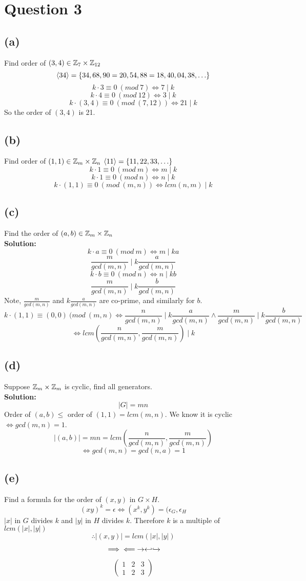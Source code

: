 \documentclass[openany]{report}
\begin{document}
\section{Question 3}
\subsection{(a)}
Find order of $(3,4) \in \mathbb{Z}_7 \times \mathbb{Z}_{12}$
$$\langle 34 \rangle = \{34,68, 90 = 20, 54, 88=18, 40, 04, 38, \ldots \}$$
$$k \cdot 3 \equiv 0 \ (mod \ 7) \iff 7 \mid k$$
$$k \cdot 4 \equiv 0 \ (mod \ 12) \iff 3 \mid k$$
$$k \cdot (3,4) \equiv 0 \ (mod \ (7,12)) \iff 21 \mid k$$
So the order of $(3,4)$ is 21.
\subsection{(b)}
Find order of $(1,1) \in \mathbb{Z}_m \times \mathbb{Z}_n$
$\langle 11 \rangle = \{11,22,33, \ldots\}$
$$k \cdot 1 \equiv 0 \ (mod \ m) \iff m \mid k$$
$$k \cdot 1 \equiv 0 \ (mod \ n) \iff n \mid k$$
$$k \cdot (1,1) \equiv 0 \ (mod \ (m,n)) \iff lcm(n,m) \mid k$$
\subsection{(c)} Find the order of $(a,b) \in \mathbb{Z}_m \times \mathbb{Z}_n$\\[3ex]
\textbf{Solution:}
$$k \cdot a \equiv 0 \ (mod \ m) \iff m \mid ka$$
$$\frac{m}{gcd(m,n)} \mid k\frac{a}{gcd(m,n)}$$
$$k \cdot b \equiv 0 \ (mod \ n) \iff n \mid kb$$
$$\frac{m}{gcd(m,n)} \mid k\frac{b}{gcd(m,n)}$$
Note, $\frac{m}{gcd(m,n)}$ and $k\frac{a}{gcd(m,n)}$ are co-prime, and similarly for $b$.
$$k \cdot (1,1) \equiv (0,0) \ (mod \ (m,n) \iff \frac{n}{gcd(m,n)} \mid k\frac{a}{gcd(m,n)} \wedge \frac{m}{gcd(m,n)} \mid k\frac{b}{gcd(m,n)}$$
$$\iff lcm\left(\frac{n}{gcd(m,n)}, \frac{m}{gcd(m,n)}\right) \mid k$$
\subsection{(d)}
Suppose $\mathbb{Z}_m \times \mathbb{Z}_m$ is cyclic, find all generators.\\[3ex]
\textbf{Solution:}
$$|G| = mn$$
Order of $(a,b) \leq$ order of $(1,1) = lcm(m,n)$. We know it is cyclic $\iff gcd(m,n) = 1$. 
$$|(a,b)| = mn = lcm\left(\frac{n}{gcd(m,n)}, \frac{m}{gcd(m,n)}\right) $$
$$\iff gcd(m,n) = gcd(n,a) = 1$$
\subsection{(e)}
Find a formula for the order of $(x,y)$ in $G \times H$. 
$$(xy)^k = \epsilon \iff (x^k, y^k) = (\epsilon_G, \epsilon_H$$
$|x|$ in $G$ divides $k$ and $|y|$ in $H$ divides $k$. Therefore $k$ is a multiple of $lcm(|x|, |y|)$
$$\therefore |(x,y)| = lcm(|x|,|y|)$$

$$\implies \impliedby \rightarrow \hookleftarrow \xhookrightarrow{}$$

$$\begin{pmatrix}
1 & 2 & 3\\
1 & 2 & 3
\end{pmatrix}$$
\end{document}
